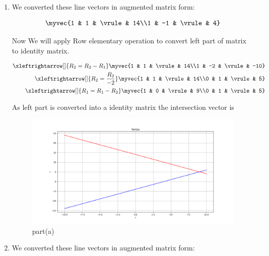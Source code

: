 \begin{enumerate}[label=\thesection.\arabic*.,ref=\thesection.\theenumi]
\begin{enumerate}
    \item We converted these line vectors in augmented matrix form:

\begin{align*}
    \myvec{1 & 1 & \vrule & 14\\1 & -1 & \vrule & 4}\\
\end{align*} 

Now We will apply Row elementary operation to convert left part of matrix to identity matrix.

\begin{align*}
    \xleftrightarrow[]{R_{2}=R_{2}-R_{1}} \myvec{1 & 1 & \vrule & 14\\1 & -2 & \vrule & -10}
\\
    \xleftrightarrow[]{R_{2}=\frac{R_{2}}{-2}} \myvec{1 & 1 & \vrule & 14\\0 & 1 & \vrule & 5}
\\
    \xleftrightarrow[]{R_{1}=R_{1}-R_{2}} \myvec{1 & 0 & \vrule & 9\\0 & 1 & \vrule & 5}
\end{align*}

As left part is converted into a identity matrix the intersection vector is 
    
\renewcommand{\thefigure}{\theenumi.\arabic{figure}}
\begin{figure}[!ht]
    \centering
    \includegraphics[width=\columnwidth]{./figures/A1_parta}
\caption{part(a)}
\label{fig: part(a)}
\end{figure}

\item We converted these line vectors in augmented matrix form: 


\end{enumerate}
\end{enumerate}
